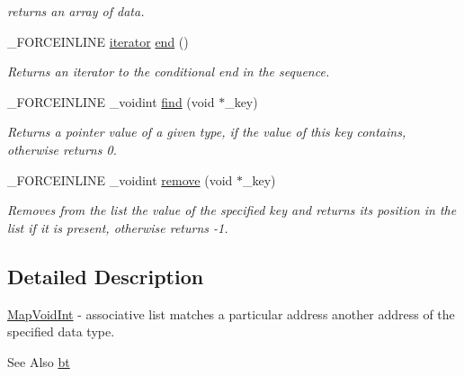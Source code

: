 \begin{DoxyCompactItemize}
\begin{DoxyCompactList}\small\item\em returns an array of data. \end{DoxyCompactList}\item 
\hypertarget{classbt_1_1_map_void_int_aced24314ee89e29eb15b3e7fcb78661f}{\-\_\-\-F\-O\-R\-C\-E\-I\-N\-L\-I\-N\-E \hyperlink{classbt_1_1_map_void_int_1_1iterator}{iterator} \hyperlink{classbt_1_1_map_void_int_aced24314ee89e29eb15b3e7fcb78661f}{end} ()}\label{classbt_1_1_map_void_int_aced24314ee89e29eb15b3e7fcb78661f}

\begin{DoxyCompactList}\small\item\em Returns an iterator to the conditional end in the sequence. \end{DoxyCompactList}\item 
\hypertarget{classbt_1_1_map_void_int_a7fd8a88dbcd95d9e06b8dcb9593e0b84}{\-\_\-\-F\-O\-R\-C\-E\-I\-N\-L\-I\-N\-E \-\_\-voidint \hyperlink{classbt_1_1_map_void_int_a7fd8a88dbcd95d9e06b8dcb9593e0b84}{find} (void $\ast$\-\_\-key)}\label{classbt_1_1_map_void_int_a7fd8a88dbcd95d9e06b8dcb9593e0b84}

\begin{DoxyCompactList}\small\item\em Returns a pointer value of a given type, if the value of this key contains, otherwise returns 0. \end{DoxyCompactList}\item 
\hypertarget{classbt_1_1_map_void_int_a0bc73313baa666b6c284a08c0bab76ff}{\-\_\-\-F\-O\-R\-C\-E\-I\-N\-L\-I\-N\-E \-\_\-voidint \hyperlink{classbt_1_1_map_void_int_a0bc73313baa666b6c284a08c0bab76ff}{remove} (void $\ast$\-\_\-key)}\label{classbt_1_1_map_void_int_a0bc73313baa666b6c284a08c0bab76ff}

\begin{DoxyCompactList}\small\item\em Removes from the list the value of the specified key and returns its position in the list if it is present, otherwise returns -\/1. \end{DoxyCompactList}\end{DoxyCompactItemize}


\subsection{Detailed Description}
\hyperlink{classbt_1_1_map_void_int}{Map\-Void\-Int} -\/ associative list matches a particular address another address of the specified data type. 

\begin{DoxySeeAlso}{See Also}
\hyperlink{namespacebt}{bt} 
\end{DoxySeeAlso}
